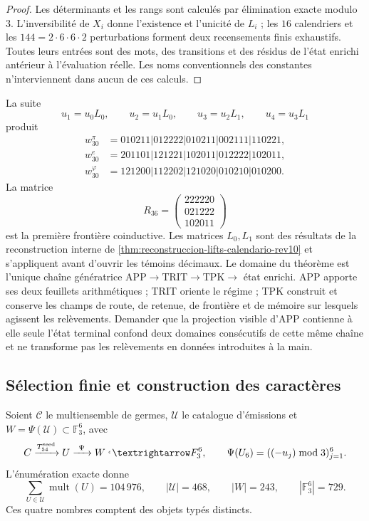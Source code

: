 \begin{proof}
Les déterminants et les rangs sont calculés par élimination exacte modulo \(3\).
L'inversibilité de \(X_i\) donne l'existence et l'unicité de \(L_i\) ; les
\(16\) calendriers et les \(144=2\cdot6\cdot6\cdot2\) perturbations forment
deux recensements finis exhaustifs. Toutes leurs entrées sont des mots, des transitions
et des résidus de l'état enrichi antérieur à l'évaluation réelle. Les noms
conventionnels des constantes n'interviennent dans aucun de ces calculs.
\end{proof}

La suite
\[
u_1=u_0L_0,\qquad u_2=u_1L_0,\qquad
u_3=u_2L_1,\qquad u_4=u_3L_1
\]
produit
\[
\begin{aligned}
w_{30}^{\pi}&=010211|012222|010211|002111|110221,\\
w_{30}^{e}&=201101|121221|102011|012222|102011,\\
w_{30}^{\varphi}&=121200|112202|121020|010210|010200.
\end{aligned}
\]
La matrice
\[
R_{36}=
\begin{pmatrix}
222220\\021222\\102011
\end{pmatrix}
\]
est la première frontière coinductive. Les matrices \(L_0,L_1\) sont des résultats
de la reconstruction interne de
\cref{thm:reconstruccion-lifts-calendario-rev10} et s'appliquent avant d'ouvrir
les témoins décimaux. Le domaine du théorème est l'unique chaîne génératrice
\(\mathrm{APP}\to\mathrm{TRIT}\to\mathrm{TPK}\to\) état enrichi.
APP apporte ses deux feuillets arithmétiques ; TRIT oriente le régime ; TPK construit
et conserve les champs de route, de retenue, de frontière et de mémoire sur lesquels agissent
les relèvements. Demander que la projection visible d'APP contienne à elle
seule l'état terminal confond deux domaines consécutifs de cette même
chaîne et ne transforme pas les relèvements en données introduites à la main.

\subsection{Sélection finie et construction des caractères}

Soient \(\mathcal C\) le multiensemble de germes, \(\mathcal U\) le catalogue
d'émissions et \(W=\Psi(\mathcal U)\subset\mathbb F_3^6\), avec
\[
 \mathcal C\xrightarrow{T_{54}^{\rm seed}}\mathcal U
 \xrightarrow{\ \Psi\ }W\lhook\joinrel\longrightarrow\mathbb F_3^6,
 \qquad
 \Psi(U_6)=((-u_j)\bmod3)_{j=1}^6.
\]
L'énumération exacte donne
\[
 \sum_{U\in\mathcal U}\operatorname{mult}(U)=104\,976,\qquad
 |\mathcal U|=468,\qquad |W|=243,\qquad|\mathbb F_3^6|=729.
\]
Ces quatre nombres comptent des objets typés distincts.

